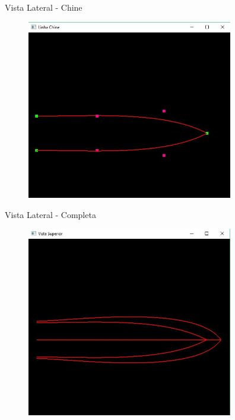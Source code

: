 \documentclass{beamer}
\begin{document}
\begin{frame}{Vista Lateral - Chine}
\begin{figure}[h]	
\centering
\includegraphics[width=9cm]{linhachineplan}
\end{figure}
\end{frame}
\begin{frame}{Vista Lateral - Completa}
\begin{figure}[h]	
\centering
\includegraphics[width=9cm]{superioropengl}
\end{figure}
\end{frame}
\end{document}
